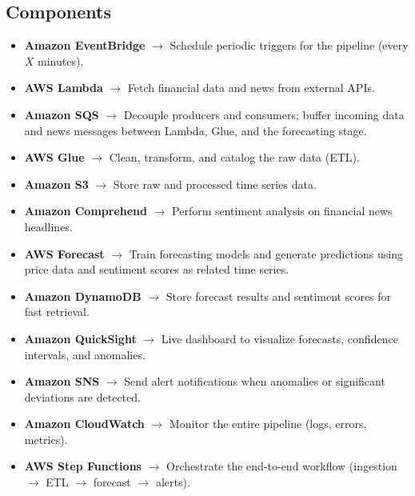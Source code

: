 \documentclass[a4paper,12pt]{article}
\begin{document}
\subsection{Components}
\begin{itemize}[leftmargin=1.2em]
    \item \textbf{Amazon EventBridge} $\rightarrow$ Schedule periodic triggers for the pipeline (every $X$ minutes).
    \item \textbf{AWS Lambda} $\rightarrow$ Fetch financial data and news from external APIs.
    \item \textbf{Amazon SQS} $\rightarrow$ Decouple producers and consumers; buffer incoming data and news messages between Lambda, Glue, and the forecasting stage.
    \item \textbf{AWS Glue} $\rightarrow$ Clean, transform, and catalog the raw data (ETL).
    \item \textbf{Amazon S3} $\rightarrow$ Store raw and processed time series data.
    \item \textbf{Amazon Comprehend} $\rightarrow$ Perform sentiment analysis on financial news headlines.
    \item \textbf{AWS Forecast} $\rightarrow$ Train forecasting models and generate predictions using price data and sentiment scores as related time series.
    \item \textbf{Amazon DynamoDB} $\rightarrow$ Store forecast results and sentiment scores for fast retrieval.
    \item \textbf{Amazon QuickSight} $\rightarrow$ Live dashboard to visualize forecasts, confidence intervals, and anomalies.
    \item \textbf{Amazon SNS} $\rightarrow$ Send alert notifications when anomalies or significant deviations are detected.
    \item \textbf{Amazon CloudWatch} $\rightarrow$ Monitor the entire pipeline (logs, errors, metrics).
    \item \textbf{AWS Step Functions} $\rightarrow$ Orchestrate the end-to-end workflow (ingestion $\rightarrow$ ETL $\rightarrow$ forecast $\rightarrow$ alerts).
\end{itemize}
\end{document}
